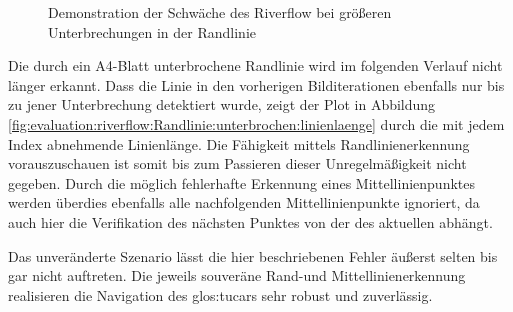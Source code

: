 \begin{figure}[htbp] %
	\hfill
	\label{fig:evaluation:riverflow:Randlinie:unterbrochen}
	\caption{Demonstration der Schwäche des Riverflow bei größeren Unterbrechungen in der Randlinie}
\end{figure}

Die durch ein A4-Blatt unterbrochene Randlinie wird im folgenden Verlauf nicht länger erkannt. Dass die Linie in den vorherigen Bilditerationen ebenfalls nur bis zu jener Unterbrechung detektiert wurde, zeigt der Plot in Abbildung \ref{fig:evaluation:riverflow:Randlinie:unterbrochen:linienlaenge} durch die mit jedem Index abnehmende Linienlänge. Die Fähigkeit mittels Randlinienerkennung vorauszuschauen ist somit bis zum Passieren dieser Unregelmäßigkeit nicht gegeben. Durch die möglich fehlerhafte Erkennung eines Mittellinienpunktes werden überdies ebenfalls alle nachfolgenden Mittellinienpunkte ignoriert, da auch hier die Verifikation des nächsten Punktes von der des aktuellen abhängt. 

Das unveränderte Szenario lässt die hier beschriebenen Fehler äußerst selten bis gar nicht auftreten. Die jeweils souveräne Rand-und Mittellinienerkennung realisieren die Navigation des \gls{glos:tucar}s sehr robust und zuverlässig. 

